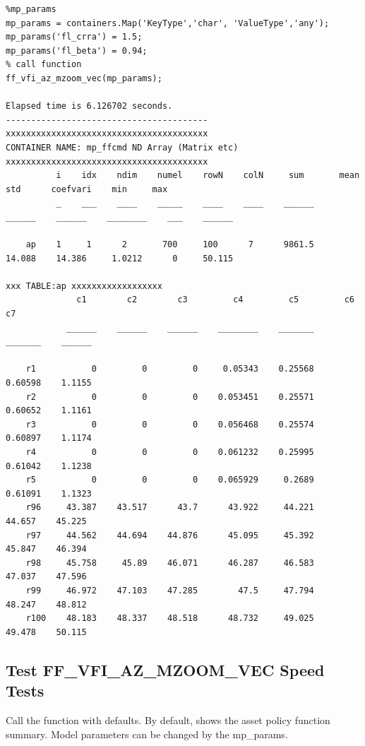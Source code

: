 \documentclass[
]{book}
\begin{document}
\begin{verbatim}
%mp_params
mp_params = containers.Map('KeyType','char', 'ValueType','any');
mp_params('fl_crra') = 1.5;
mp_params('fl_beta') = 0.94;
% call function
ff_vfi_az_mzoom_vec(mp_params);

Elapsed time is 6.126702 seconds.
----------------------------------------
xxxxxxxxxxxxxxxxxxxxxxxxxxxxxxxxxxxxxxxx
CONTAINER NAME: mp_ffcmd ND Array (Matrix etc)
xxxxxxxxxxxxxxxxxxxxxxxxxxxxxxxxxxxxxxxx
          i    idx    ndim    numel    rowN    colN     sum       mean      std      coefvari    min     max  
          _    ___    ____    _____    ____    ____    ______    ______    ______    ________    ___    ______

    ap    1     1      2       700     100      7      9861.5    14.088    14.386     1.0212      0     50.115

xxx TABLE:ap xxxxxxxxxxxxxxxxxx
              c1        c2        c3         c4         c5         c6         c7  
            ______    ______    ______    ________    _______    _______    ______

    r1           0         0         0     0.05343    0.25568    0.60598    1.1155
    r2           0         0         0    0.053451    0.25571    0.60652    1.1161
    r3           0         0         0    0.056468    0.25574    0.60897    1.1174
    r4           0         0         0    0.061232    0.25995    0.61042    1.1238
    r5           0         0         0    0.065929     0.2689    0.61091    1.1323
    r96     43.387    43.517      43.7      43.922     44.221     44.657    45.225
    r97     44.562    44.694    44.876      45.095     45.392     45.847    46.394
    r98     45.758     45.89    46.071      46.287     46.583     47.037    47.596
    r99     46.972    47.103    47.285        47.5     47.794     48.247    48.812
    r100    48.183    48.337    48.518      48.732     49.025     49.478    50.115
\end{verbatim}

\hypertarget{test-ff_vfi_az_mzoom_vec-speed-tests}{%
\subsection{Test FF\_VFI\_AZ\_MZOOM\_VEC Speed Tests}\label{test-ff_vfi_az_mzoom_vec-speed-tests}}

Call the function with defaults. By default, shows the asset policy
function summary. Model parameters can be changed by the mp\_params.
\end{document}

